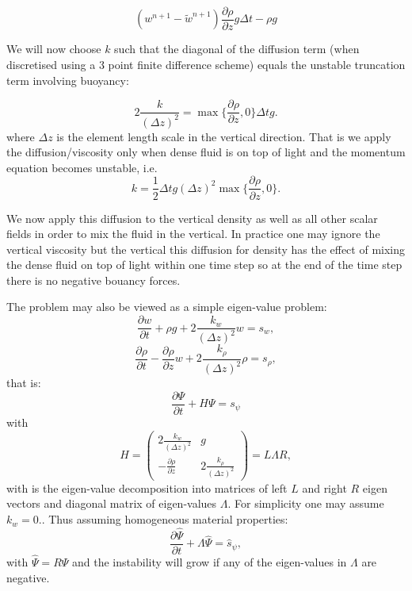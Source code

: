 \begin{equation}
(w^{n+1}-\tilde w^{n+1}) \frac{\partial \rho}{\partial z} g \Delta t -\rho g
\label{w-boy}
\end{equation}

We will now choose $k$ such that the diagonal of the diffusion 
term (when discretised using a 3 point finite difference scheme) 
equals the unstable truncation term involving buoyancy: 

\begin{equation}
2\frac{k}{(\Delta z)^2} = \max{ \{ \frac{\partial \rho}{\partial z}, 0\} } \Delta t g.
\label{k-eqn}
\end{equation}
where $\Delta z$ is the element length scale in the vertical direction. 
That is we apply the diffusion/viscosity only when dense fluid is on top of 
light and the momentum equation becomes unstable, i.e. 
\begin{equation}
k= \frac{1}{2}\Delta t g (\Delta z)^2 \max{ \{ \frac{\partial \rho}{\partial z}, 0\} }.
\label{k-value}
\end{equation} 

We now apply this diffusion to the vertical density as well as 
all other scalar fields in order to mix the fluid in the vertical. 
In practice one may ignore the vertical viscosity but the vertical 
this diffusion for density has the effect of mixing the dense fluid 
on top of light within one time step so at the end of the time step 
there is no negative bouancy forces. 

The problem may also be viewed as a simple eigen-value problem:
\begin{equation}
\frac{\partial w}{\partial t} + \rho g + 2\frac{k_w}{(\Delta z)^2} w= s_w,
\label{w-e-prob}
\end{equation} 
\begin{equation}
\frac{\partial \rho}{\partial t} - 
\frac{\partial \rho}{\partial z} w + 2\frac{k_\rho}{(\Delta z)^2} \rho= s_\rho,
\label{rho-e-prob}
\end{equation} 
that is:
\begin{equation}
\frac{\partial \Psi}{\partial t} + H \Psi = s_\psi
\label{w-rho-e-prob}
\end{equation} 
with 
\begin{equation}
H=  \begin{pmatrix}
   2\frac{k_w}{(\Delta z)^2}  &  g \\
-\frac{\partial \rho}{\partial z}   &  2\frac{k_\rho}{(\Delta z)^2} 
\end{pmatrix} 
= L \Lambda R, 
\label{stab_matrix}
\end{equation}
with is the eigen-value decomposition into matrices 
of left $L$ and right $R$ eigen vectors and 
diagonal matrix of eigen-values $\Lambda$. For simplicity one may assume 
$k_w=0.$. 
Thus assuming homogeneous material properties: 
\begin{equation}
\frac{\partial \hat \Psi}{\partial t} + \Lambda \hat\Psi = \hat s_\psi, 
\label{e-prob}
\end{equation} 
with $\hat\Psi=R\Psi$ and the instability will grow if any of the 
eigen-values in $\Lambda$ are negative. 



